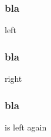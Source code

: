 \documentclass{beamer}
\begin{document}
\begin{frame}
    \frametitle{bla}
  left
\end{frame} 

\begin{frame}[imagetitle=example-grid-100x100bp.pdf]
    \frametitle{bla}
  right
\end{frame}

\begin{frame}
    \frametitle{bla}
  is left again
\end{frame}
\end{document}
